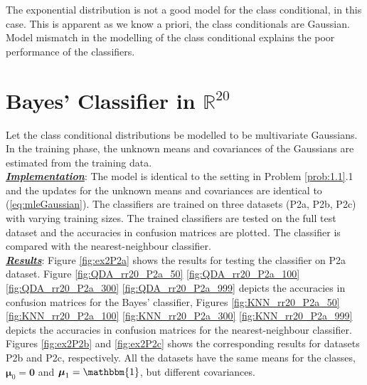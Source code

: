 \documentclass[12pt, a4 paper]{article}
\newcommand{\rr}{\mathbb{R}}
\newcommand{\bmu}{\boldsymbol{\mu}}
\begin{document}
The exponential distribution is not a good model for the class conditional, in this case. This is apparent as we know a priori, the class conditionals are Gaussian. Model mismatch in the modelling of the class conditional explains the poor performance of the classifiers.


\section{Bayes' Classifier in $\rr^{20}$}
\label{sec:bayes20D}

\label{prob:2}
Let the class conditional distributions be modelled to be multivariate Gaussians. In the training phase, the unknown means and covariances of the Gaussians are estimated from the training data. \\

\underline {\it \bfseries Implementation}: The model is identical to the setting in Problem \ref{prob:1.1}.1 and the updates for the unknown means and covariances are identical to (\ref{eq:mleGaussian}). The classifiers are trained on three datasets (P2a, P2b, P2c) with varying training sizes. The trained classifiers are tested on the full test dataset and the accuracies in confusion matrices are plotted. The classifier is compared with the nearest-neighbour classifier. \\

\underline {\it \bfseries Results}: Figure \ref{fig:ex2P2a} shows the results for testing the classifier on P2a dataset. Figure \ref{fig:QDA_rr20_P2a_50} \ref{fig:QDA_rr20_P2a_100} \ref{fig:QDA_rr20_P2a_300} \ref{fig:QDA_rr20_P2a_999} depicts the accuracies in confusion matrices for the Bayes' classifier, Figures \ref{fig:KNN_rr20_P2a_50} \ref{fig:KNN_rr20_P2a_100} \ref{fig:KNN_rr20_P2a_300} \ref{fig:KNN_rr20_P2a_999} depicts the accuracies in confusion matrices for the nearest-neighbour classifier. Figures \ref{fig:ex2P2b} and \ref{fig:ex2P2c} shows the corresponding results for datasets P2b and P2c, respectively. All the datasets have the same means for the classes, $\bmu_{0} = \boldsymbol{0}$ and $\bmu_{1} = \mathbbm{1}$, but different covariances. \\
\end{document}
